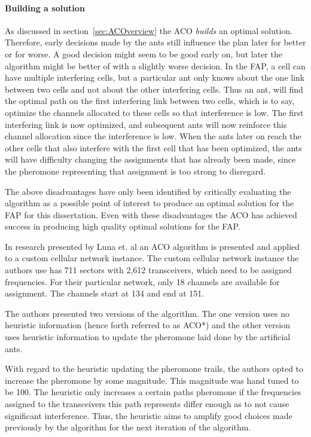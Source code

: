 \paragraph{Building a solution}
As discussed in section~\ref{sec:ACOverview} the ACO \emph{builds} an optimal solution. Therefore, early decisions made by the ants still influence the plan later for better or for worse. A good decision might seem to be good early on, but later the algorithm might be better of with a slightly worse decision. In the FAP, a cell can have multiple interfering cells, but a particular ant only knows about the one link between two cells and not about the other interfering cells. Thus an ant, will find the optimal path on the first interfering link between two cells, which is to say, optimize the channels allocated to these cells so that interference is low. The first interfering link is now optimized, and subsequent ants will now reinforce this channel allocation since the interference is low. When the ants later on reach the other cells that also interfere with the first cell that has been optimized, the ants will have difficulty changing the assignments that has already been made, since the pheromone representing that assignment is too strong to disregard.

The above disadvantages have only been identified by critically evaluating the algorithm as a possible point of interest to produce an optimal solution for the FAP for this dissertation. Even with these disadvantages the ACO has achieved success in producing high quality optimal solutions for the FAP.

In research presented by Luna et. al\cite{ACOvsEA} an ACO algorithm is presented and applied to a custom cellular network instance. The custom cellular network instance the authors use has 711 sectors with 2,612 transceivers, which need to be assigned frequencies. For their particular network, only 18 channels are available for assignment. The channels start at 134 and end at 151\cite{ACOvsEA}.

The authors presented two versions of the algorithm. The one version uses no heuristic information (hence forth referred to as ACO*) and the other version uses heuristic information to update the pheromone laid done by the artificial ants\cite{ACOvsEA}.

With regard to the heuristic updating the pheromone trails, the authors opted to increase the pheromone by some magnitude\cite{ACOvsEA}. This magnitude was hand tuned to be 100. The heuristic only increases a certain paths pheromone if the frequencies assigned to the transceivers this path represents differ enough as to not cause significant interference\cite{ACOvsEA}. Thus, the heuristic aims to amplify good choices made previously by the algorithm for the next iteration of the algorithm.


